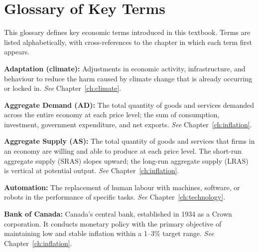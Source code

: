 
\chapter*{Glossary of Key Terms}

\noindent This glossary defines key economic terms introduced in this textbook. Terms are listed alphabetically, with cross-references to the chapter in which each term first appears.

\vspace{12pt}

\noindent\textbf{Adaptation (climate):} Adjustments in economic activity, infrastructure, and behaviour to reduce the harm caused by climate change that is already occurring or locked in. \textit{See} Chapter~\ref{ch:climate}.

\vspace{6pt}
\noindent\textbf{Aggregate Demand (AD):} The total quantity of goods and services demanded across the entire economy at each price level; the sum of consumption, investment, government expenditure, and net exports. \textit{See} Chapter~\ref{ch:inflation}.

\vspace{6pt}
\noindent\textbf{Aggregate Supply (AS):} The total quantity of goods and services that firms in an economy are willing and able to produce at each price level. The short-run aggregate supply (SRAS) slopes upward; the long-run aggregate supply (LRAS) is vertical at potential output. \textit{See} Chapter~\ref{ch:inflation}.

\vspace{6pt}
\noindent\textbf{Automation:} The replacement of human labour with machines, software, or robots in the performance of specific tasks. \textit{See} Chapter~\ref{ch:technology}.

\vspace{6pt}
\noindent\textbf{Bank of Canada:} Canada's central bank, established in 1934 as a Crown corporation. It conducts monetary policy with the primary objective of maintaining low and stable inflation within a 1--3\% target range. \textit{See} Chapter~\ref{ch:inflation}.


